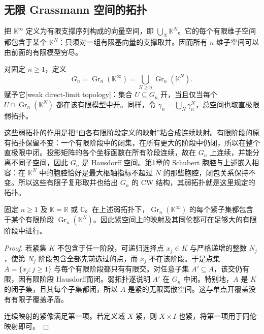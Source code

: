 \subsection{无限 Grassmann 空间的拓扑}
\label{g2:subsec:1902:04}
把 \(\mathbb K^\infty\) 定义为有限支撑序列构成的向量空间，即 \(\bigcup_N\mathbb K^N\)。它的每个有限维子空间都包含于某个 \(\mathbb K^N\)：只须对一组有限基向量的支撑取并。因而所有 \(n\) 维子空间可以由前面的有限模型穷尽。

\begin{definition}\label{g2:def:infinite-grassmann}
	对固定 \(n\ge1\)，定义
	\[
		G_n=\operatorname{Gr}_n(\mathbb K^\infty)
		=\bigcup_{N\ge n}\operatorname{Gr}_n(\mathbb K^N).
	\]
	赋予它[weak direct-limit topology]：集合 \(U\subseteq G_n\) 开，当且仅当每个 \(U\cap\operatorname{Gr}_n(\mathbb K^N)\) 都在该有限模型中开。同样，令 \(\gamma_n=\bigcup_N\gamma_n^N\)，总空间也取直极限弱拓扑。
\end{definition}

这些弱拓扑的作用是把“由各有限阶段定义的映射”粘合成连续映射。有限阶段的原有拓扑保留不变：一个有限阶段中的闭集，在所有更大的阶段中仍闭，所以在整个直极限中闭。投影矩阵的各个坐标函数在所有阶段连续，故在 \(G_n\) 上连续，并能分离不同子空间，因此 \(G_n\) 是 Hausdorff 空间。第1章的 Schubert 胞腔与上述嵌入相容：在 \(\mathbb K^N\) 中的胞腔恰好是最大枢轴指标不超过 \(N\) 的那些胞腔，闭包关系保持不变。所以这些有限子复形取并也给出 \(G_n\) 的 CW 结构，其弱拓扑就是这里规定的拓扑。

\begin{lemma}\label{g2:lem:grassmann-compact-stage}
	固定 \(n\ge1\) 及 \(\mathbb K=\mathbb R\) 或 \(\mathbb C\)。在上述弱拓扑下，\(\operatorname{Gr}_n(\mathbb K^\infty)\) 的每个紧子集都包含于某个有限阶段 \(\operatorname{Gr}_n(\mathbb K^N)\)。因此紧空间上的映射及其同伦都可在足够大的有限阶段中进行。
\end{lemma}
\begin{proof}
	若紧集 \(K\) 不包含于任一阶段，可递归选择点 \(x_j\in K\) 与严格递增的整数 \(N_j\)，使第 \(N_j\) 阶段包含全部先前选过的点，而 \(x_j\) 不在该阶段。于是点集 \(A=\{x_j:j\ge1\}\) 与每个有限阶段都只有有限交。对任意子集 \(A'\subseteq A\)，该交仍有限，因有限阶段 Hausdorff而闭。弱拓扑遂说明 \(A'\) 在 \(G_n\) 中闭。特别地，\(A\) 是 \(K\) 的闭子集，且其每个子集都闭，所以 \(A\) 是紧的无限离散空间。这与单点开覆盖没有有限子覆盖矛盾。

	连续映射的紧像满足第一项。若定义域 \(X\) 紧，则 \(X\times I\) 也紧，将第一项用于同伦映射即可。
\end{proof}

